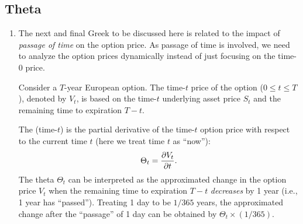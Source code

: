 \subsection{Theta}
\begin{enumerate}
\item The next and final Greek to be discussed here is related to the impact of
\emph{passage of time} on the option price. As passage of time is involved, we
need to analyze the option prices dynamically instead of just focusing on the
time-0 price.

Consider a \(T\)-year European option. The time-\(t\) price of the option
(\(0\le t\le T\)), denoted by \(V_t\), is based on the time-\(t\) underlying
asset price \(S_t\) and the remaining time to expiration \(T-t\).

The (time-\(t\))  is the partial derivative of the time-\(t\)
option price with respect to the current time \(t\) (here we treat time \(t\)
as ``now''):
\[
\Theta_t=\pdv{V_t}{t}.
\]
The theta \(\Theta_t\) can be interpreted as the approximated change in the
option price \(V_t\) when the remaining time to expiration \(T-t\)
\emph{decreases} by 1 year (i.e., 1 year has ``passed''). Treating 1 day to be
\(1/365\) years, the approximated change after the ``passage'' of 1 day can be
obtained by \(\Theta_t\times (1/365)\).


\end{enumerate}
